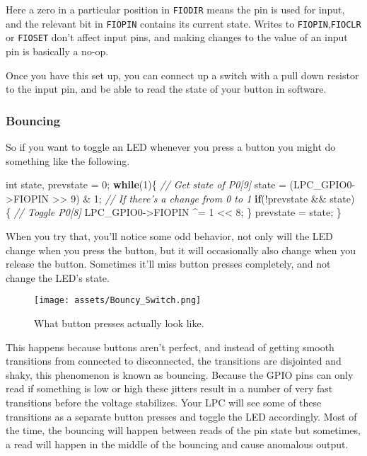 \documentclass[]{article}
\makeatletter
\newenvironment{Shaded}{\begin{snugshade}}{\end{snugshade}}
\newcommand{\KeywordTok}[1]{\textcolor[rgb]{0.13,0.29,0.53}{\textbf{{#1}}}}
\newcommand{\DataTypeTok}[1]{\textcolor[rgb]{0.13,0.29,0.53}{{#1}}}
\newcommand{\DecValTok}[1]{\textcolor[rgb]{0.00,0.00,0.81}{{#1}}}
\newcommand{\CommentTok}[1]{\textcolor[rgb]{0.56,0.35,0.01}{\textit{{#1}}}}
\newcommand{\NormalTok}[1]{{#1}}
\def\maxwidth{\ifdim\Gin@nat@width>\linewidth\linewidth
\else\Gin@nat@width\fi}
\let\Oldincludegraphics\includegraphics
\renewcommand{\includegraphics}[1]{\Oldincludegraphics[width=\maxwidth]{#1}}
\makeatother
\begin{document}
Here a zero in a particular position in \texttt{FIODIR} means the pin is
used for input, and the relevant bit in \texttt{FIOPIN} contains its
current state. Writes to \texttt{FIOPIN},\texttt{FIOCLR} or
\texttt{FIOSET} don't affect input pins, and making changes to the value
of an input pin is basically a no-op.

Once you have this set up, you can connect up a switch with a pull down
resistor to the input pin, and be able to read the state of your button
in software.

\subsubsection{Bouncing}

So if you want to toggle an LED whenever you press a button you might do
something like the following.

\begin{Shaded}
\begin{Highlighting}[]
    \DataTypeTok{int} \NormalTok{state, prevstate = }\DecValTok{0}\NormalTok{;}
    \KeywordTok{while}\NormalTok{(}\DecValTok{1}\NormalTok{)\{ }
        \CommentTok{// Get state of P0[9]}
        \NormalTok{state = (LPC_GPIO0->FIOPIN >> }\DecValTok{9}\NormalTok{) & }\DecValTok{1}\NormalTok{;  }
        \CommentTok{// If there's a change from 0 to 1}
        \KeywordTok{if}\NormalTok{(!prevstate && state) \{    }
            \CommentTok{// Toggle P0[8]}
            \NormalTok{LPC_GPIO0->FIOPIN ^= }\DecValTok{1} \NormalTok{<< }\DecValTok{8}\NormalTok{;      }
        \NormalTok{\}}
        \NormalTok{prevstate = state;}
    \NormalTok{\}}
\end{Highlighting}
\end{Shaded}

When you try that, you'll notice some odd behavior, not only will the
LED change when you press the button, but it will occasionally also
change when you release the button. Sometimes it'll miss button presses
completely, and not change the LED's state.

\begin{figure}[htbp]
\centering
\texttt{[image: assets/Bouncy\_Switch.png]}
\caption{What button presses actually look like.}
\end{figure}

This happens because buttons aren't perfect, and instead of getting
smooth transitions from connected to disconnected, the transitions are
disjointed and shaky, this phenomenon is known as bouncing. Because the
GPIO pins can only read if something is low or high these jitters result
in a number of very fast transitions before the voltage stabilizes. Your
LPC will see some of these transitions as a separate button presses and
toggle the LED accordingly. Most of the time, the bouncing will happen
between reads of the pin state but sometimes, a read will happen in the
middle of the bouncing and cause anomalous output.
\end{document}
